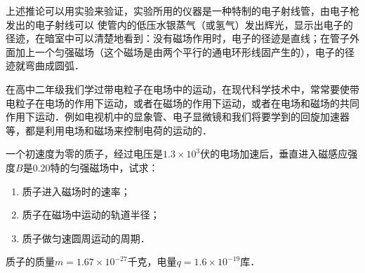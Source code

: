 上述推论可以用实验来验证，实验所用的仪器是一种特制的电子射线管，由电子枪发出的电子射线可以
使管内的低压水银蒸气（或氢气）发出辉光，显示出电子的径迹，在暗室中可以清楚地看到：没有磁场作用时，电子的径迹是直线；在管子外面加上一个匀强磁场（这个磁场是由两个平行的通电环形线固产生的），电子的径迹就弯曲成圆弧．

在高中二年级我们学过带电粒子在电场中的运动，在现代科学技术中，常常要使带电粒子在电场的作用下运动，或者在磁场的作用下运动，或者在电场和磁场的共同作用下运动．例如电视机中的显象管、电子显微镜和我们将要学到的回旋加速器等，都是利用电场和磁场来控制电荷的运动的．

\begin{example}
    一个初速度为零的质子，经过电压是$1.3\times10^3$伏的电场加速后，垂直进入磁感应强度$B$是0.20特的匀强磁场中，试求：
    \begin{enumerate}
        \item 质子进入磁场时的速率；
        \item 质子在磁场中运动的轨道半径；
        \item 质子做匀速圆周运动的周期．
    \end{enumerate}
质子的质量$m=1.67\times10^{-27}$千克，电量$q=1.6\times10^{-19}$库．
\end{example}

